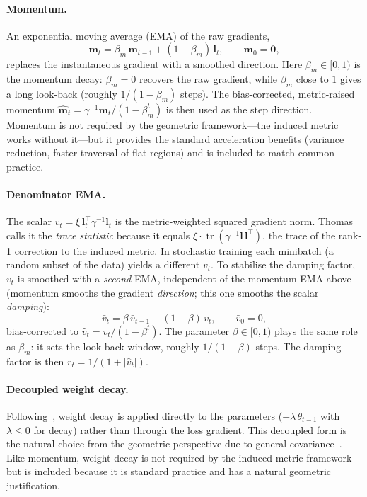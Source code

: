 \documentclass{article}
\newcommand{\vecb}[1]{\boldsymbol{#1}}
\begin{document}
\paragraph{Momentum.}
An exponential moving average (EMA) of the raw gradients,
\begin{equation}\label{eq:momentum}
    \vecb{m}_t = \beta_m\,\vecb{m}_{t-1} + (1-\beta_m)\,\vecb{l}_t,
    \qquad \vecb{m}_0 = \vecb{0},
\end{equation}
replaces the instantaneous gradient with a smoothed direction.
Here $\beta_m\in[0,1)$ is the momentum decay:
$\beta_m=0$ recovers the raw gradient, while $\beta_m$ close to $1$
gives a long look-back (roughly $1/(1-\beta_m)$ steps).
The bias-corrected, metric-raised momentum
$\hat{\vecb{m}}_t = \gamma^{-1}\vecb{m}_t/(1-\beta_m^t)$
is then used as the step direction.
Momentum is not required by the geometric framework---the induced metric
works without it---but it provides the standard acceleration benefits
(variance reduction, faster traversal of flat regions)
and is included to match common practice.

\paragraph{Denominator EMA.}
The scalar $v_t = \xi\,\vecb{l}_t^\top\gamma^{-1}\vecb{l}_t$
is the metric-weighted squared gradient norm.
Thomas~\cite{harvey2025} calls it the \emph{trace statistic} because it equals
$\xi\cdot\operatorname{tr}(\gamma^{-1}\vecb{l}\,\vecb{l}^\top)$,
the trace of the rank-1 correction to the induced metric.
In stochastic training each minibatch (a random subset of the data) yields a different $v_t$.
To stabilise the damping factor, $v_t$ is smoothed with a \emph{second} EMA,
independent of the momentum EMA above
(momentum smooths the gradient \emph{direction}; this one smooths the scalar \emph{damping}):
\begin{equation}\label{eq:denom-ema}
    \bar{v}_t = \beta\,\bar{v}_{t-1} + (1-\beta)\,v_t,
    \qquad \bar{v}_0 = 0,
\end{equation}
bias-corrected to $\hat{v}_t = \bar{v}_t/(1-\beta^t)$.
The parameter $\beta\in[0,1)$ plays the same role as $\beta_m$:
it sets the look-back window, roughly $1/(1-\beta)$ steps.
The damping factor is then $r_t = 1/(1+|\hat{v}_t|)$.

\paragraph{Decoupled weight decay.}
Following~\cite{harvey2025}, weight decay is applied directly to the parameters
($+\lambda\,\theta_{t-1}$ with $\lambda\le 0$ for decay)
rather than through the loss gradient.
This decoupled form is the natural choice
from the geometric perspective due to general covariance~\cite{harvey2025}.
Like momentum, weight decay is not required by the induced-metric framework
but is included because it is standard practice and has a natural geometric justification.
\end{document}
